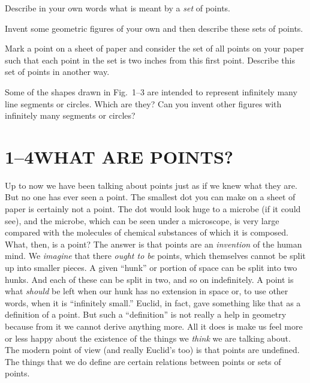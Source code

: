 \documentclass[11pt]{book}
\begin{document}
\begin{exercisecols}
\begin{exlist}
\item Describe in your own words what is meant by a \emph{set} of points.
\item Invent some geometric figures of your own and then describe these sets of
      points.
\item Mark a point on a sheet of paper and consider the set of all points on your
      paper such that each point in the set is two inches from this first point.
      Describe this set of points in another way.
\item Some of the shapes drawn in Fig.~1--3 are intended to represent infinitely
      many line segments or circles. Which are they? Can you invent other figures
      with infinitely many segments or circles?
\end{exlist}
\end{exercisecols}

\section*{1--4\quad WHAT ARE POINTS?}

Up to now we have been talking about points just as if we knew what they are. But
no one has ever seen a point. The smallest dot you can make on a sheet of paper
is certainly not a point. The dot would look huge to a microbe (if it could see),
and the microbe, which can be seen under a microscope, is very large compared
with the molecules of chemical substances of which it is composed. What, then, is
a point? The answer is that points are an \emph{invention} of the human mind. We
\emph{imagine} that there \emph{ought to be} points, which themselves cannot be
split up into smaller pieces. A given ``hunk'' or portion of space can be split
into two hunks. And each of these can be split in two, and so on indefinitely. A
point is what \emph{should} be left when our hunk has no extension in space or,
to use other words, when it is ``infinitely small.'' Euclid, in fact, gave
something like that as a definition of a point. But such a ``definition'' is not
really a help in geometry because from it we cannot derive anything more. All it
does is make us feel more or less happy about the existence of the things we
\emph{think} we are talking about. The modern point of view (and really Euclid's
too) is that points are undefined. The things that we do define are certain
relations between points or sets of points.
\end{document}

